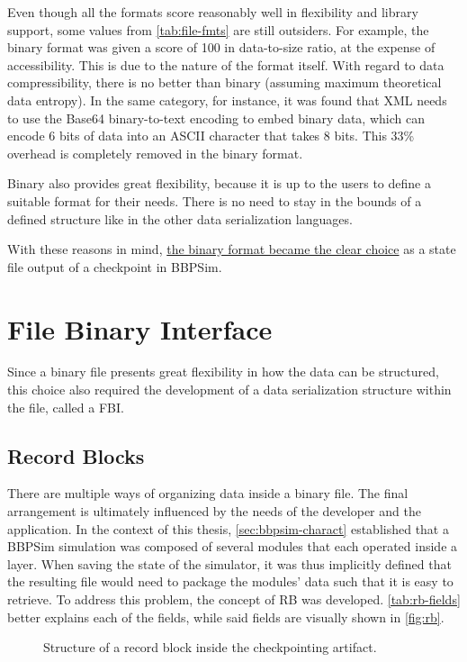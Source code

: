 {Even though all the formats score reasonably well in flexibility and library support, some values from \autoref{tab:file-fmts} are still outsiders. For example, the binary format was given a score of 100 in data-to-size ratio, at the expense of accessibility. This is due to the nature of the format itself. With regard to data compressibility, there is no better than binary (assuming maximum theoretical data entropy\cite{art:shannon}). In the same category, for instance, it was found that XML needs to use the Base64 binary-to-text encoding to embed binary data, which can encode 6 bits of data into an \gls{ASCII} character that takes 8 bits\cite{art:base64}. This 33\% overhead is completely removed in the binary format. 

Binary also provides great flexibility, because it is up to the users to define a suitable format for their needs. There is no need to stay in the bounds of a defined structure like in the other data serialization languages.

With these reasons in mind, \ul{the binary format became the clear choice} as a state file output of a checkpoint in BBPSim.

\section{File Binary Interface}
Since a binary file presents great flexibility in how the data can be structured, this choice also required the development of a data serialization structure within the file, called a \gls{FBI}.

\subsection*{Record Blocks}
There are multiple ways of organizing data inside a binary file. The final arrangement is ultimately influenced by the needs of the developer and the application. In the context of this thesis, \autoref{sec:bbpsim-charact} established that a BBPSim simulation was composed of several modules that each operated inside a layer. When saving the state of the simulator, it was thus implicitly defined that the resulting file would need to package the modules' data such that it is easy to retrieve. To address this problem, the concept of \gls{RB} was developed. \autoref{tab:rb-fields} better explains each of the fields, while said fields are visually shown in \autoref{fig:rb}.

\begin{figure}[h]
	\vspace{6pt}
	\small
	\centering
	
	\caption{Structure of a record block inside the checkpointing artifact.}
	\label{fig:rb}
\end{figure}

}

